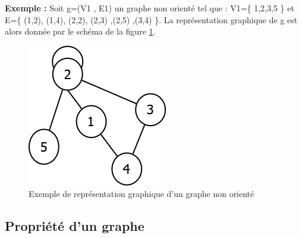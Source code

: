 \textbf{Exemple :}
 Soit g=(V1 , E1) un graphe non orienté tel que : V1=\{ 1,2,3,5 \} et E=\{ (1,2), (1,4), (2,2), (2,3) ,(2,5) ,(3,4) \}.
La représentation graphique de g est alors donnée par le schéma de la figure \ref{graphNonOriente}.
\\
\begin{figure}[H]
\begin{center}
\includegraphics[height=120 pt, width=130 pt]{./ressources/image/graphNonOriente.png} 
\end{center}
\caption{Exemple de représentation graphique d'un graphe non orienté}
\label{graphNonOriente}
\end{figure}

		\subsection{Propriété d'un graphe} %
		
